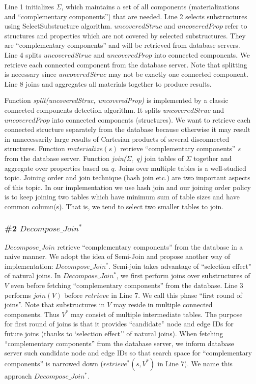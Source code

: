 Line 1 initializes $\Sigma$, which maintains a set of all components (materializations and ``complementary  components'') that are needed. Line 2 selects substructures using SelectSubstructure algorithm. $uncoveredStruc$ and $uncoveredProp$ refer to structures and properties which are not covered by selected substructures. They are ``complementary components'' and will be retrieved from database servers. Line 4 splits $uncoveredStruc$ and $uncoveredProp$ into connected components. We retrieve each connected component from the database server. Note that splitting is necessary since $uncoveredStruc$ may not be exactly one connected component. Line 8 joins and aggregates all materials together to produce results.

Function \textit{split(uncoveredStruc, uncoveredProp)} is implemented by a classic connected components detection algorithm. It splits $uncoveredStruc$ and $uncoveredProp$ into connected components (structures). We want to retrieve each connected structure separately from the database because otherwise it may result in unnecessarily large results of Cartesian products of several disconnected structures. Function \textit{$materialize(s)$} retrieve ``complementary components'' $s$ from the database server. Function \textit{join($\Sigma$, q)} join tables of $\Sigma$ together and aggregate over properties based on $q$. Joins over multiple tables is a well-studied topic. Joining order and join technique (hash join etc.) are two important aspects of this topic. In our implementation we use hash join and our joining order policy is to keep joining two tables which have minimum sum of table sizes and have common column(s). That is, we tend to select two smaller tables to join.

\subsubsection{\#2 $Decompose\_Join^{*}$}
$Decompose\_Join$ retrieve ``complementary components'' from the database in a naive manner. We adopt the idea of Semi-Join \cite{DBLP:journals/dr/Ozsoyoglu99} and propose another way of implementation: $Decompose\_Join^{*}$. Semi-join takes advantage of ``selection effect'' of natural joins. In $Decompose\_Join^{*}$, we first perform joins over substructures of $V$ even before fetching ``complementary components'' from the database. Line 3 performs $join(V)$ before $retrieve$ in Line 7. We call this phase ``first round of joins''.  Note that substructures in $V$ may reside in multiple connected components. Thus $V^{*}$ may consist of multiple intermediate tables. The purpose for first round of joins is that it provides ``candidate'' node and edge IDs for future joins (thanks to `selection effect'' of natural joins). When fetching ``complementary components'' from the database server, we inform database server such candidate node and edge IDs so that search space for ``complementary components'' is narrowed down ($retrieve^{*}(s, V^{*})$ in Line 7). We name this approach $Decompose\_Join^{*}$.

